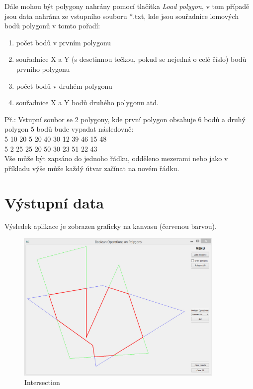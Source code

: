 \documentclass[a4paper, 12pt]{article}
\begin{document}
\noindent Dále mohou být polygony nahrány pomocí tlačítka \textit{Load polygon}, v tom případě jsou data nahrána ze vstupního souboru *.txt, kde jsou souřadnice lomových bodů polygonů v tomto pořadí:
\begin{enumerate}
\item	počet bodů v prvním polygonu 
\item	 souřadnice X a Y (s desetinnou tečkou, pokud se nejedná o celé číslo) bodů prvního polygonu
\item	 počet bodů v druhém polygonu
\item souřadnice X a Y bodů druhého polygonu atd.
\end{enumerate}

Př.: Vstupní soubor se 2 polygony, kde první polygon obsahuje 6 bodů a druhý polygon 5 bodů bude vypadat následovně:\\
 
 5 10 20 5 20 40 30 12 39 46 15 48\\
5 2 25 25 20 50 30 23 51 22 43\\

Vše může být zapsáno do jednoho řádku, odděleno mezerami nebo jako v příkladu výše může každý útvar začínat na novém řádku.\\

\section{Výstupní data}
Výsledek aplikace je zobrazen graficky na kanvasu (červenou barvou).

\begin{figure}[h]
	\centering
	\includegraphics[width=10cm]{inter.jpg}
	\caption{Intersection}
\end{figure}
\clearpage
\end{document}
